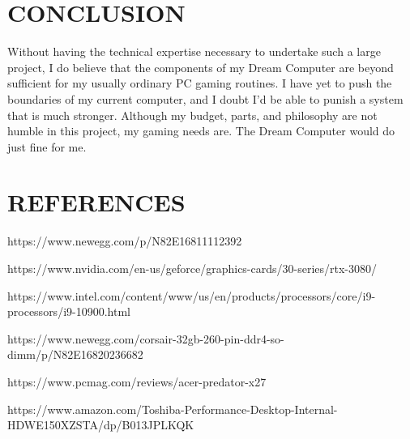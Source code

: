 \documentclass[letterpaper, 10 pt, conference]{IEEEconf}
\begin{document}
\section{CONCLUSION}

Without having the technical expertise necessary to undertake such a large project, I do believe that the components of my Dream Computer are beyond sufficient for my usually ordinary PC gaming routines. I have yet to push the boundaries of my current computer, and I doubt I'd be able to punish a system that is much stronger. Although my budget, parts, and philosophy are not humble in this project, my gaming needs are. The Dream Computer would do just fine for me.

\section*{REFERENCES}


\begin{enumerate}[label={[\arabic*]}]
\item https://www.newegg.com/p/N82E16811112392
\item https://www.nvidia.com/en-us/geforce/graphics-cards/30-series/rtx-3080/
\item https://www.intel.com/content/www/us/en/products/processors/core/i9-processors/i9-10900.html
\item https://www.newegg.com/corsair-32gb-260-pin-ddr4-so-dimm/p/N82E16820236682
\item https://www.pcmag.com/reviews/acer-predator-x27
\item https://www.amazon.com/Toshiba-Performance-Desktop-Internal-HDWE150XZSTA/dp/B013JPLKQK
\end{enumerate}
\end{document}

